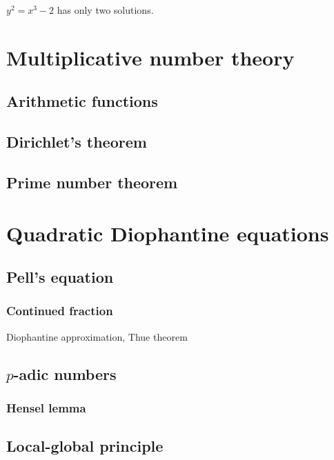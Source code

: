 \documentclass{../../large}
\begin{document}
\begin{prb}
\begin{parts}
\item $y^2=x^3-2$ has only two solutions.
\end{parts}
\end{prb}









\part{Multiplicative number theory}
\chapter{Arithmetic functions}
\chapter{Dirichlet's theorem}
\chapter{Prime number theorem}




\part{Quadratic Diophantine equations}
\chapter{Pell's equation}
\section{Continued fraction}
Diophantine approximation, Thue theorem

\chapter{$p$-adic numbers}
\section{Hensel lemma}

\chapter{Local-global principle}
\end{document}
